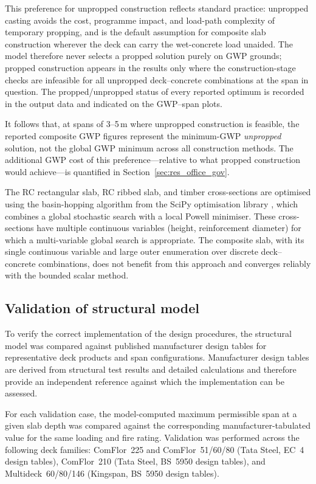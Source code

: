This preference for unpropped construction reflects standard practice: unpropped casting avoids the cost, programme impact, and load-path complexity of temporary propping, and is the default assumption for composite slab construction wherever the deck can carry the wet-concrete load unaided. The model therefore never selects a propped solution purely on GWP grounds; propped construction appears in the results only where the construction-stage checks are infeasible for all unpropped deck--concrete combinations at the span in question. The propped/unpropped status of every reported optimum is recorded in the output data and indicated on the GWP--span plots.

It follows that, at spans of 3--5\,m where unpropped construction is feasible, the reported composite GWP figures represent the minimum-GWP \emph{unpropped} solution, not the global GWP minimum across all construction methods. The additional GWP cost of this preference---relative to what propped construction would achieve---is quantified in Section~\ref{sec:res_office_gov}.

The RC rectangular slab, RC ribbed slab, and timber cross-sections are optimised using the basin-hopping algorithm from the SciPy optimisation library \citep{RefWorks:wales1997global}, which combines a global stochastic search with a local Powell minimiser. These cross-sections have multiple continuous variables (height, reinforcement diameter) for which a multi-variable global search is appropriate. The composite slab, with its single continuous variable and large outer enumeration over discrete deck--concrete combinations, does not benefit from this approach and converges reliably with the bounded scalar method.

\subsection{Validation of structural model}
\label{sec:validation}
To verify the correct implementation of the design procedures, the structural model was compared against published manufacturer design tables for representative deck products and span configurations. Manufacturer design tables are derived from structural test results and detailed calculations and therefore provide an independent reference against which the implementation can be assessed.

For each validation case, the model-computed maximum permissible span at a given slab depth was compared against the corresponding manufacturer-tabulated value for the same loading and fire rating. Validation was performed across the following deck families: ComFlor~225 and ComFlor~51/60/80 (Tata Steel, EC~4 design tables), ComFlor~210 (Tata Steel, BS~5950 design tables), and Multideck~60/80/146 (Kingspan, BS~5950 design tables). 

